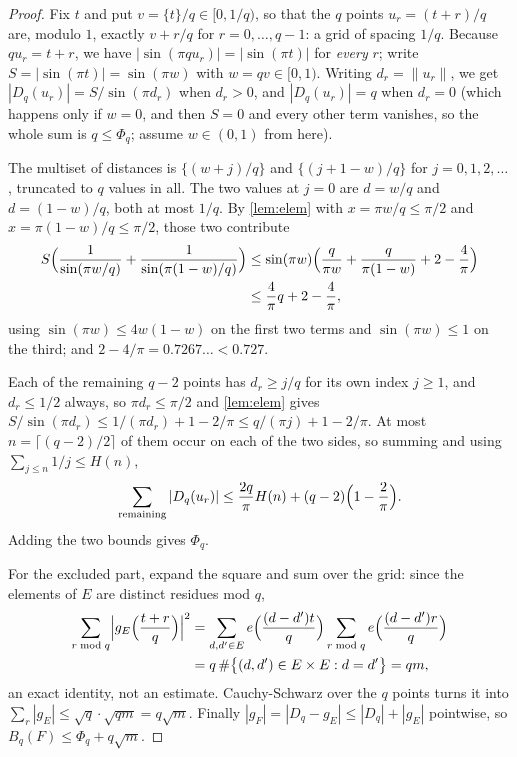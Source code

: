 \documentclass[11pt]{amsart}
\theoremstyle{definition}
\theoremstyle{remark}
\begin{document}
\begin{proof}
Fix $t$ and put $v = \{t\}/q \in [0, 1/q)$, so that the $q$ points $u_r = (t+r)/q$ are, modulo $1$, exactly $v + r/q$ for $r = 0, \dots, q-1$: a grid of spacing $1/q$. Because $q u_r = t + r$, we have $|\sin(\pi q u_r)| = |\sin(\pi t)|$ for \emph{every} $r$; write $S = |\sin(\pi t)| = \sin(\pi w)$ with $w = qv \in [0,1)$. Writing $d_r = \| u_r \|$, we get $|D_q(u_r)| = S/\sin(\pi d_r)$ when $d_r > 0$, and $|D_q(u_r)| = q$ when $d_r = 0$ (which happens only if $w = 0$, and then $S = 0$ and every other term vanishes, so the whole sum is $q \le \Phi_q$; assume $w \in (0,1)$ from here).

The multiset of distances is $\{(w + j)/q\}$ and $\{(j + 1 - w)/q\}$ for $j = 0, 1, 2, \dots$, truncated to $q$ values in all. The two values at $j = 0$ are $d = w/q$ and $d = (1-w)/q$, both at most $1/q$. By \cref{lem:elem} with $x = \pi w/q \le \pi/2$ and $x = \pi(1-w)/q \le \pi/2$, those two contribute
\begin{align*}
  S\Bigl( \frac{1}{\sin(\pi w/q)} + \frac{1}{\sin(\pi (1-w)/q)} \Bigr)
  &\le \sin(\pi w) \Bigl( \frac{q}{\pi w} + \frac{q}{\pi(1-w)} + 2 - \frac4\pi \Bigr) \\
  &\le \frac{4}{\pi} q + 2 - \frac{4}{\pi},
\end{align*}
using $\sin(\pi w) \le 4w(1-w)$ on the first two terms and $\sin(\pi w) \le 1$ on the third; and $2 - 4/\pi = 0.7267\ldots < 0.727$.

Each of the remaining $q - 2$ points has $d_r \ge j/q$ for its own index $j \ge 1$, and $d_r \le 1/2$ always, so $\pi d_r \le \pi/2$ and \cref{lem:elem} gives $S/\sin(\pi d_r) \le 1/(\pi d_r) + 1 - 2/\pi \le q/(\pi j) + 1 - 2/\pi$. At most $n = \lceil (q-2)/2 \rceil$ of them occur on each of the two sides, so summing and using $\sum_{j \le n} 1/j \le H(n)$,
\[
  \sum_{\text{remaining}} |D_q(u_r)| \le \frac{2q}{\pi} H(n) + (q-2)\Bigl(1 - \frac2\pi\Bigr).
\]
Adding the two bounds gives $\Phi_q$.

For the excluded part, expand the square and sum over the grid: since the elements of $E$ are distinct residues mod $q$,
\begin{align*}
  \sum_{r \bmod q} \Bigl| g_E\Bigl(\frac{t+r}{q}\Bigr) \Bigr|^2
  &= \sum_{d, d' \in E} e\Bigl( \frac{(d-d')t}{q} \Bigr) \sum_{r \bmod q} e\Bigl( \frac{(d-d')r}{q} \Bigr) \\
  &= q \,\#\bigl\{ (d,d') \in E \times E : d = d' \bigr\} = qm ,
\end{align*}
an exact identity, not an estimate. Cauchy-Schwarz over the $q$ points turns it into $\sum_r |g_E| \le \sqrt q \cdot \sqrt{qm} = q\sqrt m$. Finally $|g_F| = |D_q - g_E| \le |D_q| + |g_E|$ pointwise, so $B_q(F) \le \Phi_q + q\sqrt m$.
\end{proof}
\end{document}
